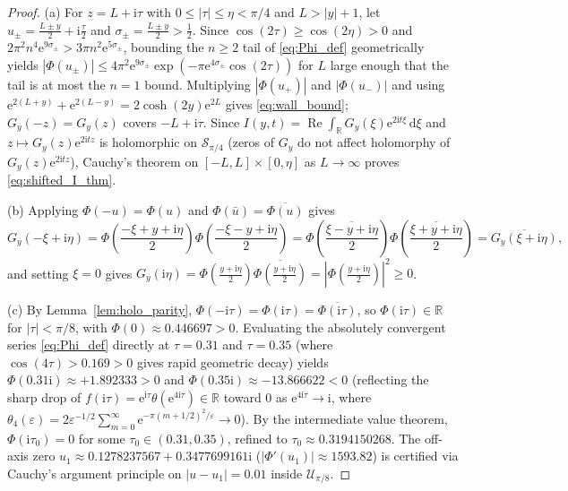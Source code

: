 \documentclass[11pt,a4paper,reqno]{amsart}
\theoremstyle{definition}
\theoremstyle{remark}
\numberwithin{equation}{section}
\newcommand{\dd}{\mathrm{d}}
\newcommand{\ii}{\mathrm{i}}
\newcommand{\ee}{\mathrm{e}}
\newcommand{\Rea}{\operatorname{Re}}
\begin{document}
\begin{proof}
(a) For $z = L + \ii\tau$ with $0 \le |\tau| \le \eta < \pi/4$ and $L > |y| + 1$, let $u_\pm = \frac{L \pm y}{2} + \ii\frac{\tau}{2}$ and $\sigma_\pm = \frac{L \pm y}{2} > \frac{1}{2}$. Since $\cos(2\tau) \ge \cos(2\eta) > 0$ and $2\pi^2 n^4\ee^{9\sigma_\pm} > 3\pi n^2\ee^{5\sigma_\pm}$, bounding the $n \ge 2$ tail of \eqref{eq:Phi_def} geometrically yields $|\Phi(u_\pm)| \le 4\pi^2\ee^{9\sigma_\pm}\exp(-\pi\ee^{4\sigma_\pm}\cos(2\tau))$ for $L$ large enough that the tail is at most the $n=1$ bound. Multiplying $|\Phi(u_+)|$ and $|\Phi(u_-)|$ and using $\ee^{2(L+y)} + \ee^{2(L-y)} = 2\cosh(2y)\ee^{2L}$ gives \eqref{eq:wall_bound}; $G_y(-z) = G_y(z)$ covers $-L + \ii\tau$. Since $I(y,t) = \Rea\int_{\mathbb{R}} G_y(\xi)\ee^{2\ii t\xi}\,\dd\xi$ and $z \mapsto G_y(z)\ee^{2\ii t z}$ is holomorphic on $\mathcal{S}_{\pi/4}$ (zeros of $G_y$ do not affect holomorphy of $G_y(z)\ee^{2\ii t z}$), Cauchy's theorem on $[-L,L]\times[0,\eta]$ as $L\to\infty$ proves \eqref{eq:shifted_I_thm}.

(b) Applying $\Phi(-u)=\Phi(u)$ and $\Phi(\bar{u})=\overline{\Phi(u)}$ gives
\[
G_y(-\xi+\ii\eta) = \Phi\!\left(\frac{-\xi+y+\ii\eta}{2}\right)\Phi\!\left(\frac{-\xi-y+\ii\eta}{2}\right)
= \Phi\!\left(\overline{\frac{\xi-y+\ii\eta}{2}}\right)\Phi\!\left(\overline{\frac{\xi+y+\ii\eta}{2}}\right) = \overline{G_y(\xi+\ii\eta)},
\]
and setting $\xi = 0$ gives $G_y(\ii\eta) = \Phi(\frac{y+\ii\eta}{2})\overline{\Phi(\frac{y+\ii\eta}{2})} = |\Phi(\frac{y+\ii\eta}{2})|^2 \ge 0$.

(c) By Lemma~\ref{lem:holo_parity}, $\Phi(-\ii\tau) = \Phi(\ii\tau) = \overline{\Phi(\ii\tau)}$, so $\Phi(\ii\tau) \in \mathbb{R}$ for $|\tau| < \pi/8$, with $\Phi(0) \approx 0.446697 > 0$. Evaluating the absolutely convergent series \eqref{eq:Phi_def} directly at $\tau = 0.31$ and $\tau = 0.35$ (where $\cos(4\tau) > 0.169 > 0$ gives rapid geometric decay) yields $\Phi(0.31\ii) \approx +1.892333 > 0$ and $\Phi(0.35\ii) \approx -13.866622 < 0$ (reflecting the sharp drop of $f(\ii\tau) = \ee^{\ii\tau}\theta(\ee^{4\ii\tau}) \in \mathbb{R}$ toward $0$ as $\ee^{4\ii\tau} \to \ii$, where $\theta_4(\varepsilon) = 2\varepsilon^{-1/2}\sum_{m=0}^\infty \ee^{-\pi(m+1/2)^2/\varepsilon} \to 0$). By the intermediate value theorem, $\Phi(\ii\tau_0) = 0$ for some $\tau_0 \in (0.31, 0.35)$, refined to $\tau_0 \approx 0.3194150268$. The off-axis zero $u_1 \approx 0.1278237567 + 0.3477699161\ii$ ($|\Phi'(u_1)| \approx 1593.82$) is certified via Cauchy's argument principle on $|u - u_1| = 0.01$ inside $\mathcal{U}_{\pi/8}$.
\end{proof}
\end{document}
